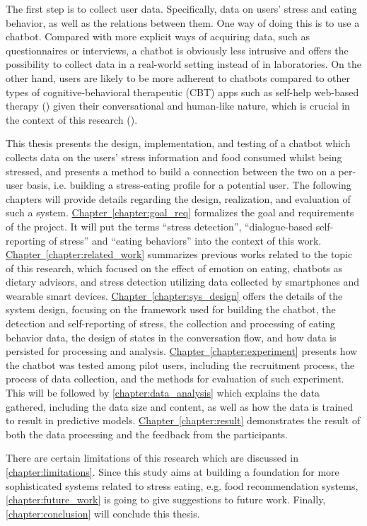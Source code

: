 \noindent The first step is to collect user data. Specifically, data on users’ stress and eating behavior, as well as the relations between them. One way of doing this is to use a chatbot. Compared with more explicit ways of acquiring data, such as questionnaires or interviews, a chatbot is obviously less intrusive and offers the possibility to collect data in a real-world setting instead of in laboratories. On the other hand, users are likely to be more adherent to chatbots compared to other types of cognitive-behavioral therapeutic (CBT) apps such as self-help web-based therapy (\cite{6_cbt}) given their conversational and human-like nature, which is crucial in the context of this research (\cite{3_woebot}).

This thesis presents the design, implementation, and testing of a chatbot which collects data on the users’ stress information and food consumed whilst being stressed, and presents a method to build a connection between the two on a per-user basis, i.e. building a stress-eating profile for a potential user. The following chapters will provide details regarding the design, realization, and evaluation of such a system. \hyperref[chapter:goal_req]{Chapter~\ref*{chapter:goal_req}} formalizes the goal and requirements of the project. It will put the terms “stress detection”, “dialogue-based self-reporting of stress” and “eating behaviors” into the context of this work. \hyperref[chapter:related_work]{Chapter~\ref*{chapter:related_work}} summarizes previous works related to the topic of this research, which focused on the effect of emotion on eating, chatbots as dietary advisors, and stress detection utilizing data collected by smartphones and wearable smart devices. \hyperref[chapter:sys_design]{Chapter~\ref*{chapter:sys_design}} offers the details of the system design, focusing on the framework used for building the chatbot, the detection and self-reporting of stress, the collection and processing of eating behavior data, the design of states in the conversation flow, and how data is persisted for processing and analysis. \hyperref[chapter:experiment]{Chapter~\ref*{chapter:experiment}} presents how the chatbot was tested among pilot users, including the recruitment process, the process of data collection, and the methods for evaluation of such experiment. This will be followed by \autoref{chapter:data_analysis} which explains the data gathered, including the data size and content, as well as how the data is trained to result in predictive models. \hyperref[chapter:result]{Chapter~\ref*{chapter:result}} demonstrates the result of both the data processing and the feedback from the participants.

There are certain limitations of this research which are discussed in \autoref{chapter:limitations}. Since this study aims at building a foundation for more sophisticated systems related to stress eating, e.g. food recommendation systems, \autoref{chapter:future_work} is going to give suggestions to future work. Finally, \autoref{chapter:conclusion} will conclude this thesis.
